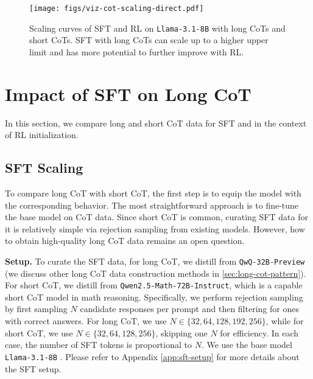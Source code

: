 \begin{figure*}[t!]
    \centering
    \texttt{[image: figs/viz-cot-scaling-direct.pdf]}
    \vspace{-6pt}
    \caption{Scaling curves of SFT and RL on \texttt{Llama-3.1-8B}  with long CoTs and short CoTs. SFT with long CoTs can scale up to a higher upper limit and has more potential to further improve with RL.}
        \vspace{-10pt}

    \label{fig:cot-scaling}
\end{figure*}

\section{Impact of SFT on Long CoT}

In this section, we compare long and short CoT data for SFT and in the context of RL initialization.

\subsection{SFT Scaling}\label{subsec:sft-scaling}

To compare long CoT with short CoT, the first step is to equip the model with the corresponding behavior. The most straightforward approach is to fine-tune the base model on CoT data. Since short CoT is common, curating SFT data for it is relatively simple via rejection sampling from existing models. However, how to obtain high-quality long CoT data remains an open question. 

\noindent\textbf{Setup.} To curate the SFT data, for long CoT, we distill from \texttt{QwQ-32B-Preview} (we discuss other long CoT data construction methods in \textsection\ref{sec:long-cot-pattern}). For short CoT, we distill from \texttt{Qwen2.5-Math-72B-Instruct}, which is a capable short CoT model in math reasoning. Specifically, we perform rejection sampling by first sampling $N$ candidate responses per prompt and then filtering for ones with correct answers. For long CoT, we use $N \in \{32, 64, 128, 192, 256\}$, while for short CoT, we use $N \in \{32, 64, 128, 256\}$, skipping one $N$ for efficiency. 
In each case, the number of SFT tokens is proportional to $N$. We use the base model \texttt{Llama-3.1-8B} \citep{meta2023llama3}. Please refer to Appendix \ref{app:sft-setup} for more details about the SFT setup.

